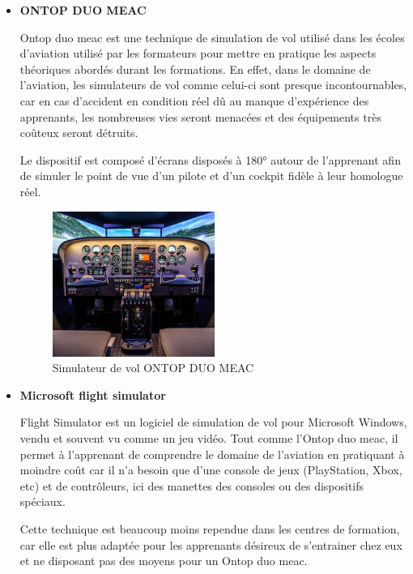\begin{itemize}
	\item \textbf{ONTOP DUO MEAC}

	      Ontop duo meac est une technique de simulation de vol utilisé dans les écoles d’aviation utilisé par les formateurs pour mettre en pratique les aspects théoriques abordés durant les formations.
	      En effet, dans le domaine de l’aviation, les simulateurs de vol comme celui-ci sont presque incontournables, car en cas d’accident en condition réel dû au manque d’expérience des apprenants, les nombreuses vies seront menacées et des équipements très coûteux seront détruits.

	      Le dispositif est composé d'écrans disposés à 180° autour de l’apprenant afin de simuler le point de vue d’un pilote et d’un cockpit fidèle à leur homologue réel.

	      \begin{figure}[H]
		      \centering
		      \includegraphics[width=0.5\textwidth]{img/svol1}
		      \caption{Simulateur de vol ONTOP DUO MEAC}
		      \label{fig:mesh1}
	      \end{figure}

	\item \textbf{Microsoft flight simulator}

	      Flight Simulator est un logiciel de simulation de vol pour Microsoft Windows, vendu et souvent vu comme un jeu vidéo. Tout comme l'Ontop duo meac, il permet à l'apprenant de comprendre le domaine de l’aviation en pratiquant à moindre coût car il n’a besoin que d’une console de jeux (PlayStation, Xbox, etc) et de contrôleurs, ici des manettes des consoles ou des dispositifs spéciaux.

	      Cette technique est beaucoup moins rependue dans les centres de formation, car elle est plus adaptée pour les apprenants désireux de s’entrainer chez eux et ne disposant pas des moyens pour un Ontop duo meac.


\end{itemize}
